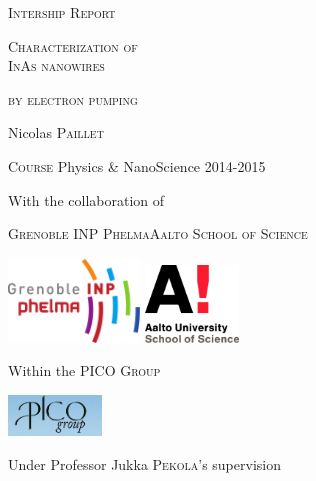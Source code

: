 \begin{titlepage}

    \begin{center}
        {\LARGE \textsc{Intership Report}}
        \vspace{0.4cm}
        
        {\huge \textsc{Characterization of}\\        
        \textsc{InAs nanowires}
        \vspace{0.4cm}
        
        \textsc{by electron pumping}}
        
        \vspace{1cm}
        
        {\LARGE Nicolas \textsc{Paillet}}\\
        \vspace{0.5cm}
        
        \textsc{Course} Physics \& NanoScience 2014-2015\\
        
        \vspace{1cm}
        
    With the collaboration of
    \vspace{0.7cm}
    
          \textsc{Grenoble INP Phelma}\hfill \textsc{Aalto School of Science}
         \vspace{1cm}
         
        \includegraphics[width=35mm]{logo_phelma.png}
        \hfill
        \includegraphics[width=25mm]{logo_aalto.png}
        
    \vspace{1cm}
    Within the PICO \textsc{Group}
    \vspace{0.5cm}
    
    \includegraphics[width=25mm]{logopico.png}
    \vspace{1cm}
    
    Under Professor Jukka \textsc{Pekola}'s supervision
       \end{center} 
\end{titlepage}
\setcounter{tocdepth}{1}
